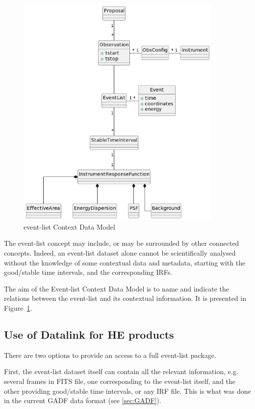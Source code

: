 \documentclass[11pt,a4paper]{ivoa}
\begin{document}
\begin{figure}
\centering
\includegraphics[width=0.9\textwidth]{EventListContext}
\caption{event-list Context Data Model}
\label{fig:EventListContext}
\end{figure}

The event-list concept may include, or may be surrounded by other connected concepts. Indeed, an event-list dataset alone cannot be scientifically analysed without the knowledge of some contextual data and metadata, starting with the good/stable time intervals, and the corresponding IRFs.

The aim of the Event-list Context Data Model is to name and indicate the relations between the event-list and its contextual information. It is presented in Figure~\ref{fig:EventListContext}.


\subsection{Use of Datalink for HE products}
\label{sec:datalink}
There are two options to provide an access to a full event-list package.

First, the event-list dataset itself can contain all the relevant information, e.g. several frames in FITS file, one corresponding to the event-list itself, and the other providing good/stable time intervals, or any IRF file. This is what was done in the current GADF data format (see \ref{sec:GADF}).
\end{document}
